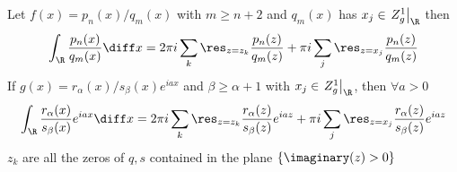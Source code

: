 \documentclass[../mmf.tex]{subfiles}
\begin{document}
\begin{thm}
	Let $f(x)=p_n(x)/q_m(x)$ with $m\ge n+2$ and $q_m(x)$ has $x_j\in \left.Z_g^1\right|_{\R}$ then
	\begin{equation}
		\int_{\R}^{}\frac{p_n(x)}{q_m(x)}\diff x=2\pi i\sum_k\res_{z=z_k}\frac{p_n(z)}{q_m(z)}+\pi i\sum_j\res_{z=x_j}\frac{p_n(z)}{q_m(z)}
		\label{eq:ratintsimple}
	\end{equation}
	If $g(x)=r_\alpha(x)/s_\beta(x)e^{iax}$ and $\beta\ge\alpha+1$ with $x_j\in\left.Z_g^1\right|_{\R}$, then $\forall a>0$
	\begin{equation}
		\int_{\R}^{}\frac{r_\alpha(x)}{s_\beta(x)}e^{iax}\diff x=2\pi i\sum_k\res_{z=z_k}\frac{r_\alpha(z)}{s_\beta(z)}e^{iaz}+\pi i\sum_j\res_{z=x_j}\frac{r_\alpha(z)}{s_\beta(z)}e^{iaz}
		\label{eq:fourierratintsimp}
	\end{equation}
	$z_k$ are all the zeros of $q,s$ contained in the plane $\{\imaginary(z)>0\}$
\end{thm}
\end{document}
